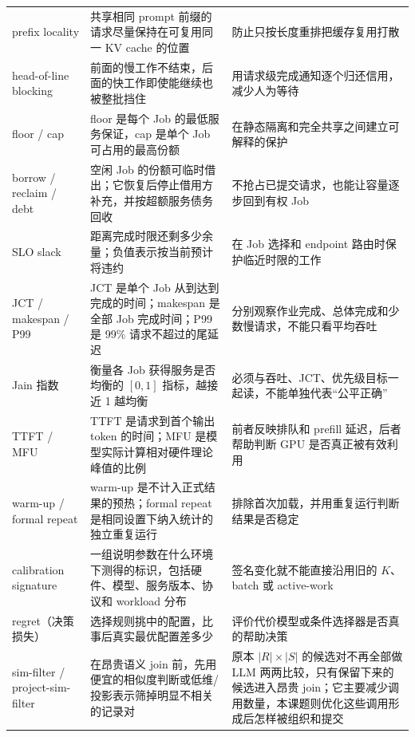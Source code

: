 \documentclass[10pt,a4paper]{ctexart}
\begin{document}
\begin{longtable}{>{\raggedright\arraybackslash}p{3.25cm}>{\raggedright\arraybackslash}p{6.1cm}>{\raggedright\arraybackslash}p{5.7cm}}
prefix locality & 共享相同 prompt 前缀的请求尽量保持在可复用同一 KV cache 的位置 & 防止只按长度重排把缓存复用打散 \\
head-of-line blocking & 前面的慢工作不结束，后面的快工作即使能继续也被整批挡住 & 用请求级完成通知逐个归还信用，减少人为等待 \\
floor / cap & floor 是每个 Job 的最低服务保证，cap 是单个 Job 可占用的最高份额 & 在静态隔离和完全共享之间建立可解释的保护 \\
borrow / reclaim / debt & 空闲 Job 的份额可临时借出；它恢复后停止借用方补充，并按超额服务债务回收 & 不抢占已提交请求，也能让容量逐步回到有权 Job \\
SLO slack & 距离完成时限还剩多少余量；负值表示按当前预计将违约 & 在 Job 选择和 endpoint 路由时保护临近时限的工作 \\
JCT / makespan / P99 & JCT 是单个 Job 从到达到完成的时间；makespan 是全部 Job 完成时间；P99 是 99\% 请求不超过的尾延迟 & 分别观察作业完成、总体完成和少数慢请求，不能只看平均吞吐 \\
Jain 指数 & 衡量各 Job 获得服务是否均衡的 $[0,1]$ 指标，越接近 1 越均衡 & 必须与吞吐、JCT、优先级目标一起读，不能单独代表“公平正确” \\
TTFT / MFU & TTFT 是请求到首个输出 token 的时间；MFU 是模型实际计算相对硬件理论峰值的比例 & 前者反映排队和 prefill 延迟，后者帮助判断 GPU 是否真正被有效利用 \\
warm-up / formal repeat & warm-up 是不计入正式结果的预热；formal repeat 是相同设置下纳入统计的独立重复运行 & 排除首次加载，并用重复运行判断结果是否稳定 \\
calibration signature & 一组说明参数在什么环境下测得的标识，包括硬件、模型、服务版本、协议和 workload 分布 & 签名变化就不能直接沿用旧的 $K$、batch 或 active-work \\
regret（决策损失） & 选择规则挑中的配置，比事后真实最优配置差多少 & 评价代价模型或条件选择器是否真的帮助决策 \\
sim-filter / project-sim-filter & 在昂贵语义 join 前，先用便宜的相似度判断或低维/投影表示筛掉明显不相关的记录对 & 原本 $|R|\times|S|$ 的候选对不再全部做 LLM 两两比较，只有保留下来的候选进入昂贵 join；它主要减少调用数量，本课题则优化这些调用形成后怎样被组织和提交 \\
\bottomrule
\end{longtable}
\end{document}
